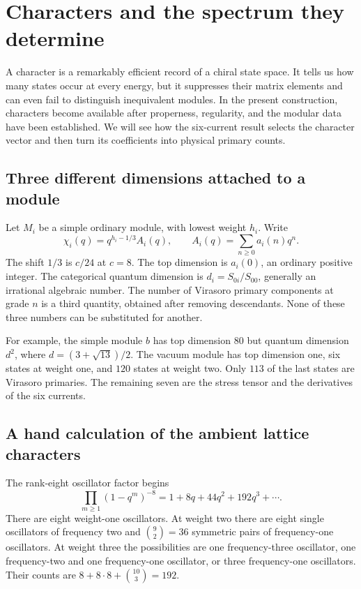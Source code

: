 \chapter{Characters and the spectrum they determine}
\label{ch:characters}

A character is a remarkably efficient record of a chiral state space.
It tells us how many states occur at every energy, but it suppresses
their matrix elements and can even fail to distinguish inequivalent
modules. In the present construction, characters become available
after properness, regularity, and the modular data have been
established. We will see how the six-current result selects the
character vector and then turn its coefficients into physical primary
counts.

\section{Three different dimensions attached to a module}

Let $M_i$ be a simple ordinary module, with lowest weight $h_i$.
Write
\begin{equation}
 \chi_i(q)=q^{h_i-1/3}A_i(q),\qquad
 A_i(q)=\sum_{n\ge0}a_i(n)q^n.
 \label{eq:char-expansion}
\end{equation}
The shift $1/3$ is $c/24$ at $c=8$.
The top dimension is $a_i(0)$, an ordinary positive integer.
The categorical quantum dimension is
$d_i=S_{0i}/S_{00}$, generally an irrational algebraic number.
The number of Virasoro primary components at grade $n$ is a third
quantity, obtained after removing descendants. None of these three
numbers can be substituted for another.

For example, the simple module $b$ has top dimension $80$ but
quantum dimension $d^2$, where $d=(3+\sqrt{13})/2$.
The vacuum module has top dimension one, six states at weight one,
and $120$ states at weight two. Only $113$ of the last states are
Virasoro primaries. The remaining seven are the stress tensor and
the derivatives of the six currents.

\section{A hand calculation of the ambient lattice characters}

The rank-eight oscillator factor begins
\begin{equation}
 \prod_{m\ge1}(1-q^m)^{-8}
 =1+8q+44q^2+192q^3+\cdots.
 \label{eq:char-eight-oscillators}
\end{equation}
There are eight weight-one oscillators. At weight two there are
eight single oscillators of frequency two and
$\binom{9}{2}=36$ symmetric pairs of frequency-one oscillators.
At weight three the possibilities are one frequency-three oscillator,
one frequency-two and one frequency-one oscillator, or three
frequency-one oscillators. Their counts are
$8+8\cdot8+\binom{10}{3}=192$.


